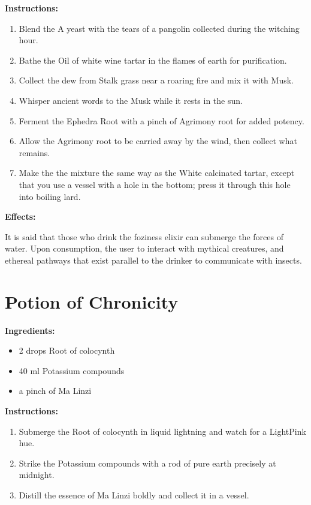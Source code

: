 \documentclass{article}
\begin{document}
\textbf{Instructions:}

\begin{enumerate}
  \item Blend the A yeast with the tears of a pangolin collected during the witching hour.
  \item Bathe the Oil of white wine tartar in the flames of earth for purification.
  \item Collect the dew from Stalk grass near a roaring fire and mix it with Musk.
  \item Whisper ancient words to the Musk while it rests in the sun.
  \item Ferment the Ephedra Root with a pinch of Agrimony root for added potency.
  \item Allow the Agrimony root to be carried away by the wind, then collect what remains.
  \item Make the the mixture the same way as the White calcinated tartar, except that you use a vessel with a hole in the bottom; press it through this hole into boiling lard.
\end{enumerate}

\textbf{Effects:}

It is said that those who drink the foziness elixir can submerge the forces of water. Upon consumption, the user to interact with mythical creatures, and ethereal pathways that exist parallel to the drinker to communicate with insects.

\newpage
\section*{Potion of Chronicity}

\textbf{Ingredients:}

\begin{itemize}
  \item 2 drops Root of colocynth
  \item 40 ml Potassium compounds
  \item a pinch of Ma Linzi
\end{itemize}

\textbf{Instructions:}

\begin{enumerate}
  \item Submerge the Root of colocynth in liquid lightning and watch for a LightPink hue.
  \item Strike the Potassium compounds with a rod of pure earth precisely at midnight.
  \item Distill the essence of Ma Linzi boldly and collect it in a vessel.
\end{enumerate}
\end{document}
